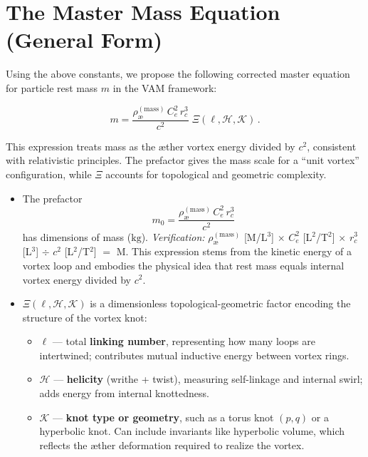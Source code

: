 \documentclass[11pt]{article}
\begin{document}
    \bigskip

\section{The Master Mass Equation (General Form)}

Using the above constants, we propose the following corrected master equation for particle rest mass $m$ in the VAM framework:

\[
    \boxed{
        m = \frac{\rho_{\text{\ae}}^{(\mathrm{mass})} \, C_e^2 \, r_c^3}{c^2} \; \Xi(\ell, \mathcal{H}, \mathcal{K}) \,.
    }
\]

This expression treats mass as the æther vortex energy divided by $c^2$, consistent with relativistic principles. The prefactor gives the mass scale for a “unit vortex” configuration, while $\Xi$ accounts for topological and geometric complexity.

\begin{itemize}
    \item The prefactor
    \[
        m_0 = \frac{\rho_{\text{\ae}}^{(\mathrm{mass})} \, C_e^2 \, r_c^3}{c^2}
    \]
    has dimensions of mass ($\mathrm{kg}$). \textit{Verification:} $\rho_{\text{\ae}}^{(\mathrm{mass})}$ [M/L$^3$] $\times$ $C_e^2$ [L$^2$/T$^2$] $\times$ $r_c^3$ [L$^3$] $\div$ $c^2$ [L$^2$/T$^2$] $=$ M. This expression stems from the kinetic energy of a vortex loop and embodies the physical idea that rest mass equals internal vortex energy divided by $c^2$.

    \item $\Xi(\ell,\mathcal{H},\mathcal{K})$ is a dimensionless topological-geometric factor encoding the structure of the vortex knot:
    \begin{itemize}
        \item $\ell$ — total \textbf{linking number}, representing how many loops are intertwined; contributes mutual inductive energy between vortex rings.

        \item $\mathcal{H}$ — \textbf{helicity} (writhe + twist), measuring self-linkage and internal swirl; adds energy from internal knottedness.

        \item $\mathcal{K}$ — \textbf{knot type or geometry}, such as a torus knot $(p,q)$ or a hyperbolic knot. Can include invariants like hyperbolic volume, which reflects the æther deformation required to realize the vortex.
    \end{itemize}
\end{itemize}
\end{document}
